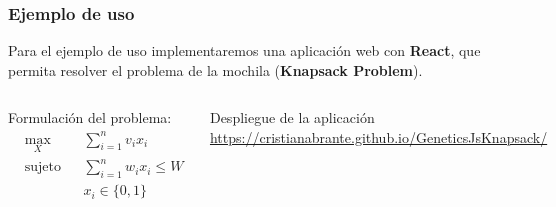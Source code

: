 \documentclass{beamer}
\begin{document}
\begin{frame}
\frametitle{Ejemplo de uso}

Para el ejemplo de uso implementaremos una aplicación web con \textbf{React}, que permita resolver el problema de la mochila (\textbf{Knapsack Problem}).

\bigskip

\begin{columns}
    Formulación del problema:
    \begin{equation*}
        \begin{aligned}
        & \underset{X}{\text{max}}
        & & \sum_{i=1}^n v_i x_i \\
        & \text{sujeto a}
        & & \sum_{i=1}^n w_i x_i \leq W \\
        &&& x_i \in \{0, 1\}
        \end{aligned}
    \end{equation*}
    \begin{block}{Despliegue de la aplicación}
     \url{https://cristianabrante.github.io/GeneticsJsKnapsack/}
    \end{block}
\end{columns}

\end{frame}

\end{document}
